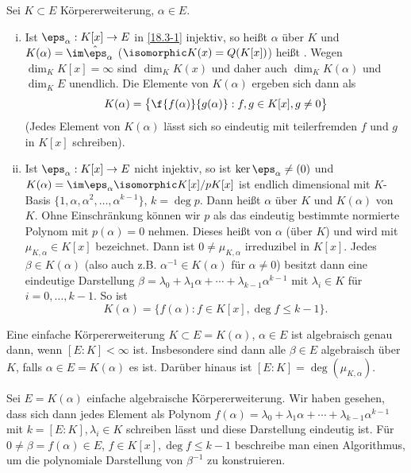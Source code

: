 \begin{df} \label{18.3-2}
	Sei $K \subset E$ Körpererweiterung, $\alpha \in E$.
	\begin{enumerate}[i)]
		\item
			Ist $\eps_\alpha : K[x] \to E$ in \ref{18.3-1} injektiv, so heißt $\alpha$  über $K$ und $K(\alpha) = \im \hat \eps_\alpha$ ($\isomorphic K(x) = Q(K[x])$) heißt .
			Wegen $\dim_K K[x] = \infty$ sind $\dim_K K(x)$ und daher auch $\dim_K K(\alpha)$ und $\dim_K E$ unendlich.
			Die Elemente von $K(\alpha)$ ergeben sich dann als
			\[
				K(\alpha) = \big\{ \f{f(\alpha)}{g(\alpha)} : f,g \in K[x], g \neq 0 \big\}
			\]
			(Jedes Element von $K(\alpha)$ lässt sich so eindeutig mit teilerfremden $f$ und $g$ in $K[x]$ schreiben).
		\item
			Ist $\eps_\alpha: K[x] \to E$ nicht injektiv, so ist $\ker \eps_\alpha \neq (0)$ und $K(\alpha) = \im \eps_\alpha \isomorphic K[x] / pK[x]$ ist endlich dimensional mit $K$-Basis $\{1, \alpha, \alpha^2, \dotsc, \alpha^{k-1}\}$, $k = \deg p$.
			Dann heißt $\alpha$  über $K$ und $K(\alpha)$  von $K$.
			Ohne Einschränkung können wir $p$ als das eindeutig bestimmte normierte Polynom mit $p(\alpha) = 0$ nehmen.
			Dieses heißt  von $\alpha$ (über $K$) und wird mit $\mu_{K,\alpha} \in K[x]$ bezeichnet.
			Dann ist $0 \neq \mu_{K, \alpha}$ irreduzibel in $K[x]$.
			Jedes $\beta \in K(\alpha)$ (also auch z.B. $\alpha^{-1} \in K(\alpha)$ für $\alpha \neq 0$) besitzt dann eine eindeutige Darstellung $\beta = \lambda_0 + \lambda_1 \alpha + \dotsb + \lambda_{k-1} \alpha^{k-1}$ mit $\lambda_i \in K$ für $i = 0, \dotsc, k-1$.
			So ist
			\[
				K(\alpha) = \big\{ f(\alpha) : f \in K[x], \deg f \le k - 1 \big\}.
			\]
	\end{enumerate}
\end{df}

\begin{kor} \label{18.3-3}
	Eine einfache Körpererweiterung $K \subset E = K(\alpha)$, $\alpha \in E$ ist algebraisch genau dann, wenn $[E : K] < \infty$ ist.
	Insbesondere sind dann alle $\beta \in E$ algebraisch über $K$, falls $\alpha \in E = K(\alpha)$ es ist.
	Darüber hinaus ist $[E : K] = \deg(\mu_{K, \alpha})$.
\end{kor}

\begin{ex} \label{18.3-4}
	Sei $E = K(\alpha)$ einfache algebraische Körpererweiterung.
	Wir haben gesehen, dass sich dann jedes Element als Polynom $f(\alpha) = \lambda_0 + \lambda_1 \alpha + \dotsb + \lambda_{k-1} \alpha^{k-1}$ mit $k = [E : K], \lambda_i \in K$ schreiben lässt und diese Darstellung eindeutig ist.
	Für $0 \neq \beta = f(\alpha) \in E$, $f \in K[x], \deg f \le k-1$ beschreibe man einen Algorithmus, um die polynomiale Darstellung von $\beta^{-1}$ zu konstruieren.
\end{ex}

